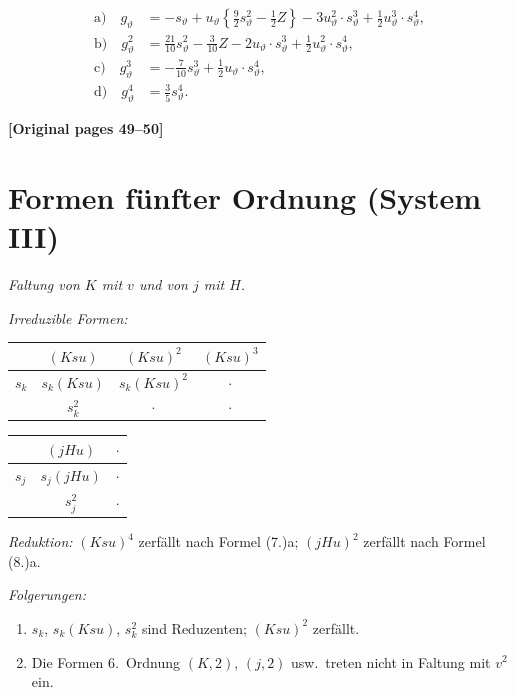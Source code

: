 \documentclass[12pt,a4paper]{article}
\begin{document}
\begin{equation}\tag{8.}
\begin{aligned}
\text{a)} \quad g_\vartheta &= -s_\vartheta + u_\vartheta \left\{\tfrac{9}{2} s_\vartheta^2 - \tfrac{1}{2} Z\right\} - 3u_\vartheta^2 \cdot s_\vartheta^3 + \tfrac{1}{2} u_\vartheta^3 \cdot s_\vartheta^4,\\
\text{b)} \quad g_\vartheta^2 &= \tfrac{21}{10} s_\vartheta^2 - \tfrac{3}{10} Z - 2u_\vartheta \cdot s_\vartheta^3 + \tfrac{1}{2} u_\vartheta^2 \cdot s_\vartheta^4,\\
\text{c)} \quad g_\vartheta^3 &= -\tfrac{7}{10} s_\vartheta^3 + \tfrac{1}{2} u_\vartheta \cdot s_\vartheta^4,\\
\text{d)} \quad g_\vartheta^4 &= \tfrac{3}{5} s_\vartheta^4.
\end{aligned}
\end{equation}

\noindent\textbf{[Original pages 49--50]}

\section{Formen fünfter Ordnung (System III)}

\textit{Faltung von $K$ mit $v$ und von $j$ mit $H$.}

\textit{Irreduzible Formen:}
\begin{center}
\begin{tabular}{c|ccc}
& $(Ksu)$ & $(Ksu)^2$ & $(Ksu)^3$ \\
\hline
$s_k$ & $s_k (Ksu)$ & $s_k (Ksu)^2$ & $\cdot$ \\
& $s_k^2$ & $\cdot$ & $\cdot$
\end{tabular}
\end{center}

\begin{center}
\begin{tabular}{c|cc}
& $(jHu)$ & $\cdot$ \\
\hline
$s_j$ & $s_j (jHu)$ & $\cdot$ \\
& $s_j^2$ & $\cdot$
\end{tabular}
\end{center}

\textit{Reduktion:} $(Ksu)^4$ zerfällt nach Formel (7.)a; $(jHu)^2$ zerfällt nach Formel (8.)a.

\textit{Folgerungen:}
\begin{enumerate}
\item[1)] $s_k$, $s_k(Ksu)$, $s_k^2$ sind Reduzenten; $(Ksu)^2$ zerfällt.
\item[2)] Die Formen 6.\ Ordnung $(K,2)$, $(j,2)$ usw.\ treten nicht in Faltung mit $v^2$ ein.
\end{enumerate}
\end{document}
